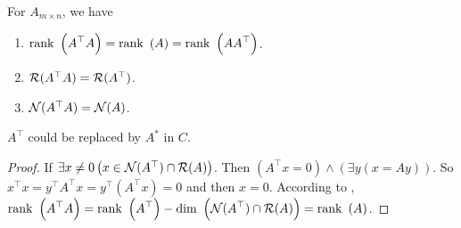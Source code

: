 \begin{theorem}\label{rankofadjoint}
    For $A_{m \times n}$, we have
    \begin{enumerate}
        \item $\displaystyle \mathrm{rank}~\left( A^\top A \right) = \displaystyle \mathrm{rank}~\left( A \right) = \displaystyle \mathrm{rank}~\left( A A^\top \right)$.
        \item $\mathcal{R}(A^\top A) = \mathcal{R}(A^\top)$.
        \item $\mathcal{N}(A^\top A) = \mathcal{N}(A)$.
    \end{enumerate}
    $A^\top$ could be replaced by $A^*$ in $C$.
\end{theorem}
\begin{proof}
    If $\exists x \neq 0 \left(x \in \mathcal{N}(A^\top) \cap \mathcal{R}(A) \right)$. Then $(A^\top x = 0) \wedge \left(\exists y(x = A y) \right)$. So $x^\top x = y^\top A^\top x = y^\top ( A^\top x) = 0 $ and then $x =0$. According to , $\displaystyle \mathrm{rank}~\left( A^\top A \right) = \displaystyle \mathrm{rank}~\left( A^\top \right) - \displaystyle \mathrm{dim}~\left( \mathcal{N}(A^\top) \cap \mathcal{R}(A) \right) = \displaystyle \mathrm{rank}~\left( A \right)$.
\end{proof}









































